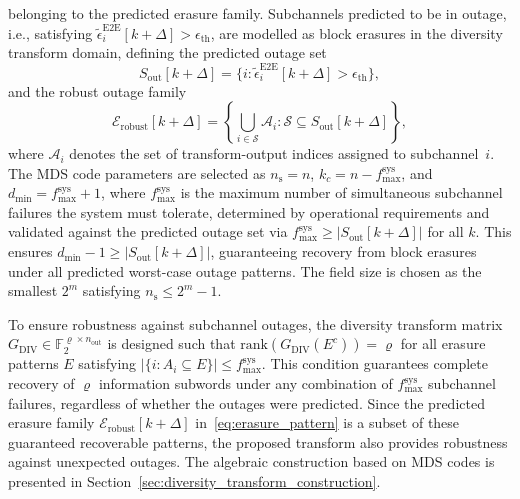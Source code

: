 \documentclass[journal]{IEEEtran}
\begin{document}
belonging to the predicted erasure family. Subchannels predicted to 
be in outage, i.e., satisfying 
$\tilde{\epsilon}_{i}^{\mathrm{E2E}}[k+\Delta] > \epsilon_{\mathrm{th}}$, 
are modelled as block erasures in the diversity transform domain, 
defining the predicted outage set
\begin{equation}
S_{\mathrm{out}}[k+\Delta] = \bigl\{i : 
\tilde{\epsilon}_{i}^{\mathrm{E2E}}[k+\Delta] > 
\epsilon_{\mathrm{th}}\bigr\},
\label{eq:outage_set}
\end{equation}
and the robust outage family
\begin{equation}
\mathcal{E}_{\mathrm{robust}}[k+\Delta] = \left\{ 
\bigcup_{i\in \mathcal{S}} \mathcal{A}_i : 
\mathcal{S} \subseteq S_{\mathrm{out}}[k+\Delta] \right\},
\label{eq:erasure_pattern}
\end{equation}
where $\mathcal{A}_i$ denotes the set of transform-output indices 
assigned to subchannel~$i$. The MDS code parameters are selected as $n_{\mathrm{s}} = n$, $k_c = n - f_{\mathrm{max}}^{\mathrm{sys}}$, and 
$d_{\min} = f_{\mathrm{max}}^{\mathrm{sys}} + 1$, where 
$f_{\mathrm{max}}^{\mathrm{sys}}$ is the maximum number of 
simultaneous subchannel failures the system must tolerate, 
determined by operational requirements and validated against 
the predicted outage set via 
$f_{\mathrm{max}}^{\mathrm{sys}} \geq |S_{\mathrm{out}}[k+\Delta]|$ 
for all $k$. This ensures $d_{\min} - 1 \geq |S_{\mathrm{out}}[k+\Delta]|$, 
guaranteeing recovery from block erasures under all predicted worst-case outage patterns. The field size is chosen as the smallest $2^m$ 
satisfying $n_{\mathrm{s}} \leq 2^m - 1$.

 To ensure robustness against subchannel outages, the diversity transform matrix $G_{\mathrm{DIV}} \in \mathbb{F}_2^{\varrho \times n_{\text{out}}}$ is designed such that $\mathrm{rank}\!\left(G_{\mathrm{DIV}}(E^{c})\right)=\varrho$ for all erasure patterns $E$
satisfying $|\{i : A_i \subseteq E\}| \leq f_{\mathrm{max}}^{\mathrm{sys}}$. This condition guarantees
complete recovery of $\varrho$ information subwords under any combination of $f_{\mathrm{max}}^{\mathrm{sys}}$ subchannel failures, regardless of whether the outages were predicted. Since the predicted erasure family $\mathcal{E}_{\mathrm{robust}}[k+\Delta]$ in~\eqref{eq:erasure_pattern} is a subset of these guaranteed recoverable patterns, the proposed transform also provides robustness against unexpected outages. The algebraic construction based on MDS codes is presented in Section~\ref{sec:diversity_transform_construction}.
\end{document}
